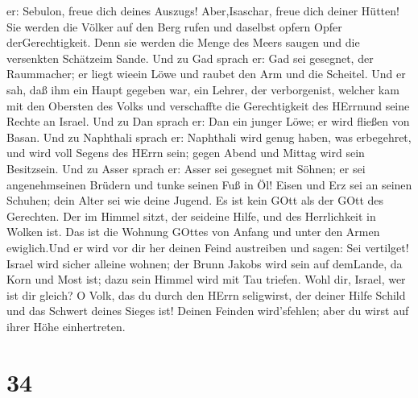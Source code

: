 er: Sebulon, freue dich deines Auszugs! Aber,Isaschar, freue dich deiner
Hütten!  Sie werden die Völker auf den Berg rufen und
daselbst opfern Opfer derGerechtigkeit. Denn sie werden die Menge des
Meers saugen und die versenkten Schätzeim Sande.  Und zu
Gad sprach er: Gad sei gesegnet, der Raummacher; er liegt wieein Löwe
und raubet den Arm und die Scheitel.  Und er sah, daß ihm
ein Haupt gegeben war, ein Lehrer, der verborgenist, welcher kam mit den
Obersten des Volks und verschaffte die Gerechtigkeit des HErrnund seine
Rechte an Israel.  Und zu Dan sprach er: Dan ein junger
Löwe; er wird fließen von Basan.  Und zu Naphthali sprach
er: Naphthali wird genug haben, was erbegehret, und wird voll Segens des
HErrn sein; gegen Abend und Mittag wird sein Besitzsein. 
Und zu Asser sprach er: Asser sei gesegnet mit Söhnen; er sei
angenehmseinen Brüdern und tunke seinen Fuß in Öl!  Eisen
und Erz sei an seinen Schuhen; dein Alter sei wie deine Jugend.
 Es ist kein GOtt als der GOtt des Gerechten. Der im Himmel
sitzt, der seideine Hilfe, und des Herrlichkeit in Wolken ist.
 Das ist die Wohnung GOttes von Anfang und unter den Armen
ewiglich.Und er wird vor dir her deinen Feind austreiben und sagen: Sei
vertilget!  Israel wird sicher alleine wohnen; der Brunn
Jakobs wird sein auf demLande, da Korn und Most ist; dazu sein Himmel
wird mit Tau triefen.  Wohl dir, Israel, wer ist dir
gleich? O Volk, das du durch den HErrn seligwirst, der deiner Hilfe
Schild und das Schwert deines Sieges ist! Deinen Feinden wird'sfehlen;
aber du wirst auf ihrer Höhe einhertreten.

\hypertarget{section-33}{%
\section{34}\label{section-33}}

